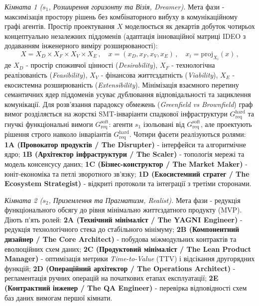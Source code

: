 \documentclass[12pt, reqno, a4paper]{amsart}
\theoremstyle{definition}
\theoremstyle{plain}
\theoremstyle{plain}
\theoremstyle{plain}
\theoremstyle{remark}
\theoremstyle{plain}
\begin{document}
{\textit{Кімната 1 ($s_1$, Розширення горизонту та Візія, Dreamer).} Мета фази - максимізація простору рішень без комбінаторного вибуху в комунікаційному графі агентів. Простір проектування $X$ моделюється як декартів добуток чотирьох концептуально незалежних піддоменів (адаптація інноваційної матриці IDEO \cite{bib12} з додаванням інженерного виміру розширюваності):
\begin{equation*}
X = X_D \times X_F \times X_V \times X_E\, , \quad x = (x_D, x_F, x_V, x_E)\, , \quad x_i = \text{proj}_{X_i}(x)\, ,
\end{equation*}
де $X_D$ - простір споживчої цінності (\textit{Desirability}), $X_F$ - технологічна реалізованість (\textit{Feasibility}), $X_V$ - фінансова життєздатність (\textit{Viability}), $X_E$ - екосистемна розширюваність (\textit{Extensibility}). Мінімізація взаємного перетину семантичних ядер піддоменів усуває дублювання відповідальності та зациклення комунікації. Для розв'язання парадоксу обмежень (\textit{Greenfield vs Brownfield}) граф вимог розділяється на жорсткі SMT-інваріанти спадкової інфраструктури $G_{\text{req}}^{\text{hard}}$ та гнучкі функціональні вимоги $G_{\text{req}}^{\text{soft}}$: агенти $s_1$ ізольовані від $G_{\text{req}}^{\text{soft}}$, але проектують рішення строго навколо інваріантів $G_{\text{req}}^{\text{hard}}$. Чотири фасети реалізуються ролями: \textbf{1A (Провокатор продуктів / The Disrupter)} - інтерфейси та алгоритмічне ядро; \textbf{1B (Архітектор інфраструктури / The Scaler)} - топологія мережі та модель консенсусу даних; \textbf{1C (Бізнес-конструктор / The Market Maker)} - юніт-економіка та петлі зворотного зв'язку; \textbf{1D (Екосистемний стратег / The Ecosystem Strategist)} - відкриті протоколи та інтеграції з третіми сторонами.

\textit{Кімната 2 ($s_2$, Приземлення та Прагматизм, Realist).} Мета фази - редукція функціонального обсягу до рівня мінімально життєздатного продукту (MVP). Діють п'ять ролей: \textbf{2A (Технічний мінімаліст / The YAGNI Engineer)} - редукція технологічного стека до стабільного мінімуму; \textbf{2B (Компонентний дизайнер / The Core Architect)} - побудова міжмодульних контрактів та еволюційних схем даних; \textbf{2C (Продуктовий мінімаліст / The Lean Product Manager)} - оптимізація метрики \textit{Time-to-Value} (TTV) і відсікання другорядних функцій; \textbf{2D (Операційний архітектор / The Operations Architect)} - регламентація ручних операцій на початкових етапах експлуатації; \textbf{2E (Контрактний інженер / The QA Engineer)} - перевірка відповідності схем баз даних вимогам першої кімнати.

}
\end{document}
